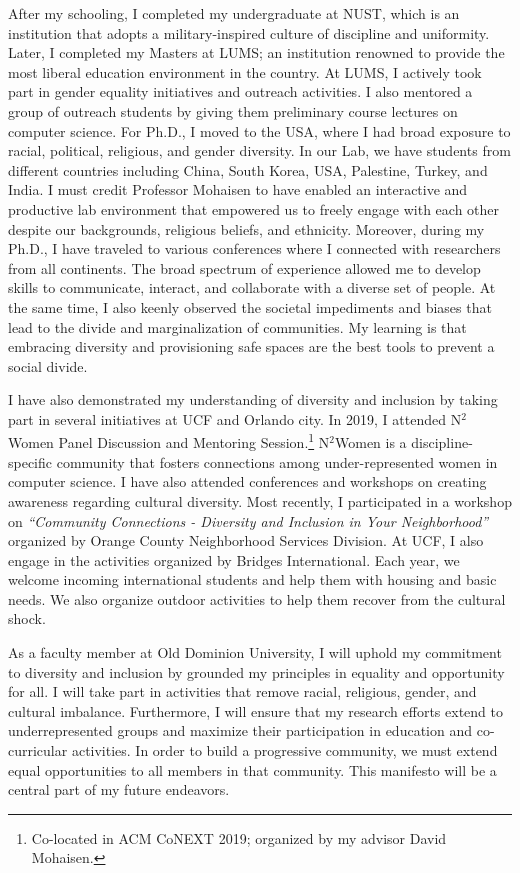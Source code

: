 \documentclass{NSF}
\newcommand{\univ}{Old Dominion University}
\begin{document}
\vspace{2mm}
After my schooling, I completed my undergraduate at NUST, which is an institution that adopts a military-inspired culture of discipline and uniformity. Later, I completed my Masters at LUMS; an institution renowned to provide the most liberal education environment in the country. At LUMS, I actively took part in gender equality initiatives and outreach activities. I also mentored a group of outreach students by giving them preliminary course lectures on computer science. For Ph.D., I moved to the USA, where I had broad exposure to racial, political, religious, and gender diversity. In our Lab, we have students from different countries including China, South Korea, USA, Palestine, Turkey, and India. I must credit Professor Mohaisen to have enabled an interactive and productive lab environment that empowered us to freely engage with each other despite our backgrounds, religious beliefs, and ethnicity. Moreover, during my Ph.D., I have traveled to various conferences where I connected with researchers from all continents. The broad spectrum of experience allowed me to develop skills to communicate, interact, and collaborate with a diverse set of people. At the same time, I also keenly observed the societal impediments and biases that lead to the divide and marginalization of communities. My learning is that embracing diversity and provisioning safe spaces are the best tools to prevent a social divide. 

\vspace{2mm}

I have also demonstrated my understanding of diversity and inclusion by taking part in several initiatives at UCF and Orlando city. In 2019, I attended N$^{2}$Women Panel Discussion and Mentoring Session.\footnote{Co-located in ACM CoNEXT 2019; organized by my advisor David Mohaisen.} N$^{2}$Women is a discipline-specific community that fosters connections among under-represented women in computer science. I have also attended conferences and workshops on creating awareness regarding cultural diversity. Most recently, I participated in a workshop on {\em ``Community Connections - Diversity and Inclusion in Your Neighborhood''} organized by Orange County Neighborhood Services Division. At UCF, I also engage in the activities organized by Bridges International. Each year, we welcome incoming international students and help them with housing and basic needs. We also organize outdoor activities to help them recover from the cultural shock.


\vspace{2mm}
As a faculty member at \univ, I will uphold my commitment to diversity and inclusion by grounded my principles in equality and opportunity for all. I will take part in activities that remove racial, religious, gender, and cultural imbalance. Furthermore, I will ensure that my research efforts extend to underrepresented groups and maximize their participation in education and co-curricular activities. In order to build a progressive community, we must extend equal opportunities to all members in that community. This manifesto will be a central part of my future endeavors.  
\end{document}
